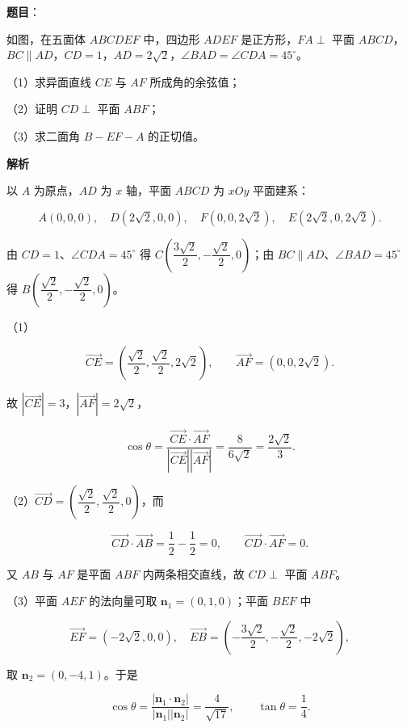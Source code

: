 \begin{answer}

\textbf{题目}：

如图，在五面体 $ABCDEF$ 中，四边形 $ADEF$ 是正方形，$FA\perp$ 平面 $ABCD$，$BC\parallel AD$，$CD=1$，$AD=2\sqrt2$，$\angle BAD=\angle CDA=45^\circ$。

（1）求异面直线 $CE$ 与 $AF$ 所成角的余弦值；

（2）证明 $CD\perp$ 平面 $ABF$；

（3）求二面角 $B-EF-A$ 的正切值。
\nopagebreak[4]
\begin{center}\end{center}
\nopagebreak[4]
\textbf{解析}

以 $A$ 为原点，$AD$ 为 $x$ 轴，平面 $ABCD$ 为 $xOy$ 平面建系：

\nopagebreak[4]
\[A(0,0,0),\quad D(2\sqrt2,0,0),\quad F(0,0,2\sqrt2),\quad E(2\sqrt2,0,2\sqrt2).\]

由 $CD=1$、$\angle CDA=45^\circ$ 得 $C\left(\dfrac{3\sqrt2}2,-\dfrac{\sqrt2}2,0\right)$；由 $BC\parallel AD$、$\angle BAD=45^\circ$ 得 $B\left(\dfrac{\sqrt2}2,-\dfrac{\sqrt2}2,0\right)$。

（1）

\nopagebreak[4]
\[\overrightarrow{CE}=\left(\frac{\sqrt2}2,\frac{\sqrt2}2,2\sqrt2\right),\qquad
\overrightarrow{AF}=(0,0,2\sqrt2).\]

故 $|\overrightarrow{CE}|=3$，$|\overrightarrow{AF}|=2\sqrt2$，

\nopagebreak[4]
\[\cos\theta=\frac{\overrightarrow{CE}\cdot\overrightarrow{AF}}{|\overrightarrow{CE}||\overrightarrow{AF}|}
=\frac{8}{6\sqrt2}=\frac{2\sqrt2}3.\]

（2）$\overrightarrow{CD}=\left(\dfrac{\sqrt2}2,\dfrac{\sqrt2}2,0\right)$，而

\nopagebreak[4]
\[\overrightarrow{CD}\cdot\overrightarrow{AB}
=\frac12-\frac12=0,\qquad
\overrightarrow{CD}\cdot\overrightarrow{AF}=0.\]

又 $AB$ 与 $AF$ 是平面 $ABF$ 内两条相交直线，故 $CD\perp$ 平面 $ABF$。

（3）平面 $AEF$ 的法向量可取 $\boldsymbol n_1=(0,1,0)$；平面 $BEF$ 中

\nopagebreak[4]
\[\overrightarrow{EF}=(-2\sqrt2,0,0),\quad
\overrightarrow{EB}=\left(-\frac{3\sqrt2}2,-\frac{\sqrt2}2,-2\sqrt2\right),\]

取 $\boldsymbol n_2=(0,-4,1)$。于是

\nopagebreak[4]
\[\cos\theta=\frac{|\boldsymbol n_1\cdot\boldsymbol n_2|}{|\boldsymbol n_1||\boldsymbol n_2|}
=\frac4{\sqrt{17}},\qquad
\tan\theta=\frac14.\]


\end{answer}
